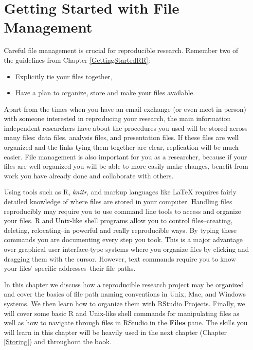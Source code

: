 



\chapter{Getting Started with File Management}\label{DirectoriesChapter}

Careful file management is crucial for reproducible research. Remember two of the guidelines from Chapter \ref{GettingStartedRR}:

\begin{itemize}
    \item Explicitly tie your files together,
    \item Have a plan to organize, store and make your files available. 
\end{itemize}

\noindent Apart from the times when you have an email exchange (or even meet in person) with someone interested in reproducing your research, the main information independent researchers have about the procedures you used will be stored across many files: data files, analysis files, and presentation files. If these files are well organized and the links tying them together are clear, replication will be much easier. File management is also important for you as a researcher, because if your files are well organized you will be able to more easily make changes, benefit from work you have already done and collaborate with others. 

Using tools such as R, {\emph{knitr}}, and markup languages like LaTeX requires fairly detailed knowledge of where files are stored in your computer. Handling files reproducibly may require you to use command line tools to access and organize your files. R and Unix-like shell programs allow you to control files--creating, deleting, relocating--in powerful and really reproducible ways. By typing these commands you are documenting every step you took. This is a major advantage over graphical user interface-type systems where you organize files by clicking and dragging them with the cursor. However, text commands require you to know your files' specific addresses--their file paths. 

In this chapter we discuss how a reproducible research project may be organized and cover the basics of file path naming conventions in Unix, Mac, and Windows systems. We then learn how to organize them with RStudio Projects. Finally, we will cover some basic R and Unix-like shell commands for manipulating files as well as how to navigate through files in RStudio in the {\bf{Files}} pane. The skills you will learn in this chapter will be heavily used in the next chapter (Chapter \ref{Storing}) and throughout the book.

